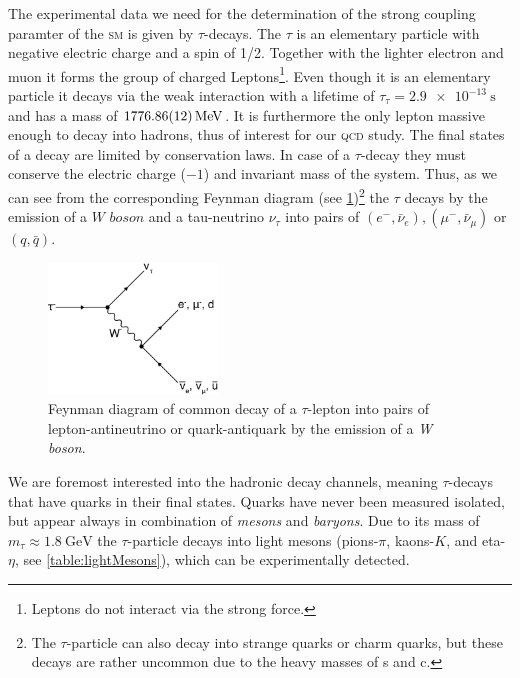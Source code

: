 \documentclass[../../index.tex]{subfiles}
\begin{document}
The experimental data we need for the determination of the strong coupling
paramter of the \textsc{sm} is
given by $\tau$-decays. The $\tau$ is an elementary particle with
negative electric charge and a spin of 1/2. Together with the lighter electron
and muon it forms the group of charged Leptons\footnote{Leptons do not
  interact via the strong force.}. Even though it is an elementary particle it
decays via the weak interaction with a lifetime of
$\tau_\tau=\SI{2.9e-13}{\second}$ and has a mass of
$\SI{1776.86\pm0.12}{\mega\electronvolt}$\cite{PDG2018}. It is furthermore the
only lepton massive enough to decay into hadrons, thus of interest for our
\textsc{qcd} study. The final states of a decay
are limited by conservation laws. In case of a $\tau$-decay they must
conserve the electric charge ($-1$) and invariant mass of the system.
Thus, as we can see from the corresponding Feynman diagram (see
\cref{fig:tauDecay})\footnote{The $\tau$-particle can also decay into strange
  quarks or charm quarks, but these decays are rather uncommon due to the heavy
  masses of s and c.} the $\tau$ decays by the emission of a $\textit{W boson}$
and a tau-neutrino $\nu_\tau$ into pairs of $(e^-, \bar\nu_e), (\mu^-,
\bar\nu_\mu)$ or $(q, \bar q)$.
\begin{figure}[h]
  \centering \includegraphics[width=0.4\textwidth]{images/tauDecay.eps}
  \caption{Feynman diagram of common decay of a $\tau$-lepton into pairs of
    lepton-antineutrino or quark-antiquark by the emission of a \textit{W
      boson}.}
  \label{fig:tauDecay}
\end{figure}
We are foremost interested into the hadronic decay channels, meaning $\tau$-decays that have quarks in their final
states. Quarks have never been measured isolated, but appear
always in combination of \textit{mesons} and \textit{baryons}. Due to its mass
of $m_\tau \approx \SI{1.8}{\giga\electronvolt}$ the $\tau$-particle decays into
light mesons (pions-$\pi$, kaons-$K$, and eta-$\eta$, see
\cref{table:lightMesons}), which can be experimentally detected.
\end{document}
